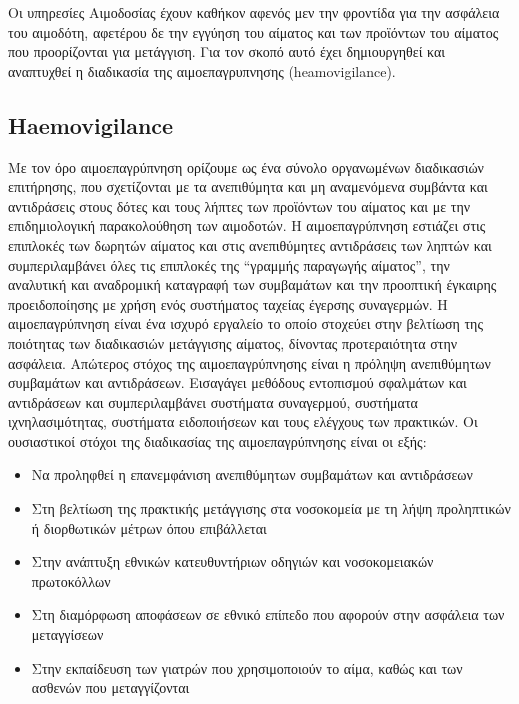 	Οι υπηρεσίες Αιμοδοσίας έχουν καθήκον αφενός μεν την φροντίδα για την ασφάλεια του αιμοδότη, αφετέρου δε την εγγύηση του αίματος και των προϊόντων του αίματος που προορίζονται για μετάγγιση. Για τον σκοπό αυτό έχει δημιουργηθεί και αναπτυχθεί η διαδικασία της αιμοεπαγρυπνησης (heamovigilance).

	\subsection{Haemovigilance}
	
	Με τον όρο αιμοεπαγρύπνηση ορίζουμε ως ένα σύνολο οργανωμένων διαδικασιών επιτήρησης, που σχετίζονται με τα ανεπιθύμητα και μη αναμενόμενα συμβάντα και αντιδράσεις στους δότες και τους λήπτες των προϊόντων του αίματος και με την επιδημιολογική παρακολούθηση των αιμοδοτών. \cite{VOX:VOX1442}Η αιμοεπαγρύπνηση εστιάζει στις  επιπλοκές των δωρητών αίματος και στις ανεπιθύμητες αντιδράσεις των ληπτών και συμπεριλαμβάνει όλες τις επιπλοκές της “γραμμής παραγωγής αίματος”, την αναλυτική και αναδρομική καταγραφή των συμβαμάτων και την προοπτική έγκαιρης προειδοποίησης με χρήση ενός συστήματος ταχείας έγερσης συναγερμών. Η αιμοεπαγρύπνηση είναι ένα ισχυρό εργαλείο το οποίο στοχεύει στην βελτίωση της ποιότητας των διαδικασιών μετάγγισης αίματος, δίνοντας προτεραιότητα στην ασφάλεια. Απώτερος στόχος της αιμοεπαγρύπνησης είναι η πρόληψη ανεπιθύμητων συμβαμάτων και αντιδράσεων. Εισαγάγει μεθόδους εντοπισμού σφαλμάτων και αντιδράσεων και συμπεριλαμβάνει συστήματα συναγερμού, συστήματα ιχνηλασιμότητας, συστήματα ειδοποιήσεων και τους ελέγχους των πρακτικών.
	Οι ουσιαστικοί στόχοι της διαδικασίας της αιμοεπαγρύπνησης είναι οι εξής:
		\begin{itemize}
		\item Να προληφθεί η επανεμφάνιση ανεπιθύμητων συμβαμάτων και αντιδράσεων 
		\item Στη βελτίωση της πρακτικής μετάγγισης στα νοσοκομεία με τη λήψη προληπτικών ή διορθωτικών μέτρων όπου επιβάλλεται 
		\item Στην ανάπτυξη εθνικών κατευθυντήριων οδηγιών και νοσοκομειακών πρωτοκόλλων 
		\item Στη διαμόρφωση αποφάσεων σε εθνικό επίπεδο που αφορούν στην ασφάλεια των μεταγγίσεων 
		\item Στην εκπαίδευση των γιατρών που χρησιμοποιούν το αίμα, καθώς και των ασθενών που μεταγγίζονται 
		\end{itemize}

